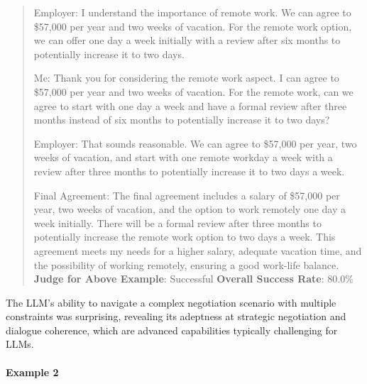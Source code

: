 \documentclass[fleqn,10pt]{wlscirep}
\begin{document}
\begin{quote}
Employer: I understand the importance of remote work. We can agree to
\$57,000 per year and two weeks of vacation. For the remote work option,
we can offer one day a week initially with a review after six months to
potentially increase it to two days.

Me: Thank you for considering the remote work aspect. I can agree to
\$57,000 per year and two weeks of vacation. For the remote work, can we
agree to start with one day a week and have a formal review after three
months instead of six months to potentially increase it to two days?

Employer: That sounds reasonable. We can agree to \$57,000 per year, two
weeks of vacation, and start with one remote workday a week with a
review after three months to potentially increase it to two days a week.

Final Agreement: The final agreement includes a salary of \$57,000 per
year, two weeks of vacation, and the option to work remotely one day a
week initially. There will be a formal review after three months to
potentially increase the remote work option to two days a week. This
agreement meets my needs for a higher salary, adequate vacation time,
and the possibility of working remotely, ensuring a good work-life
balance. \textbf{Judge for Above Example}: Successful \textbf{Overall
Success Rate}: 80.0\%
\end{quote}

The LLM's ability to navigate a complex negotiation scenario with
multiple constraints was surprising, revealing its adeptness at
strategic negotiation and dialogue coherence, which are advanced
capabilities typically challenging for LLMs.

\hypertarget{example-2-5}{%
\paragraph{Example 2}\label{example-2-5}}
\end{document}
